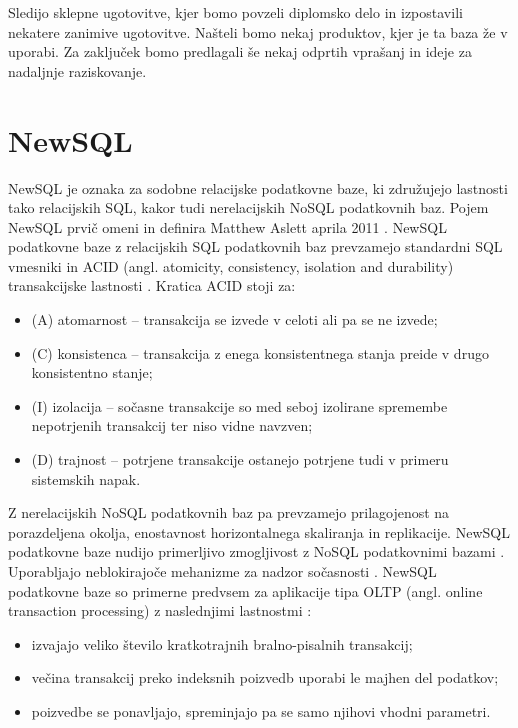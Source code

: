 \documentclass[a4paper, 12pt]{book}
\begin{document}
Sledijo sklepne ugotovitve, kjer bomo povzeli diplomsko delo in izpostavili nekatere zanimive ugotovitve. Našteli bomo nekaj produktov, kjer je ta baza že v uporabi. Za zaključek bomo predlagali še nekaj odprtih vprašanj in ideje za nadaljnje raziskovanje.


\chapter{NewSQL}
NewSQL je oznaka za sodobne relacijske podatkovne baze, ki združujejo lastnosti tako relacijskih SQL, kakor tudi nerelacijskih NoSQL podatkovnih baz. Pojem NewSQL prvič omeni in definira Matthew Aslett aprila 2011 \cite{Pavlo2016Sep}. NewSQL podatkovne baze z relacijskih SQL podatkovnih baz prevzamejo standardni SQL vmesniki in ACID (angl. atomicity, consistency, isolation and durability) transakcijske lastnosti \cite{oliveira2017newsql}. Kratica ACID stoji za:

\begin{itemize}
    \item (A) atomarnost – transakcija se izvede v celoti ali pa se ne izvede;
    \item (C) konsistenca – transakcija z enega konsistentnega stanja preide v drugo konsistentno stanje;
    \item (I) izolacija – sočasne transakcije so med seboj izolirane spremembe nepotrjenih transakcij ter niso vidne navzven;
    \item (D) trajnost – potrjene transakcije ostanejo potrjene tudi v primeru sistemskih napak.
\end{itemize}

\noindent Z nerelacijskih NoSQL podatkovnih baz pa prevzamejo prilagojenost na porazdeljena okolja, enostavnost horizontalnega skaliranja in replikacije. NewSQL podatkovne baze nudijo primerljivo zmogljivost z NoSQL podatkovnimi bazami \cite{oliveira2017newsql}. Uporabljajo neblokirajoče mehanizme za nadzor sočasnosti \cite{NewSQLNewWayToHandleBigData}. NewSQL podatkovne baze so primerne predvsem za aplikacije tipa OLTP (angl. online transaction processing) z naslednjimi lastnostmi \cite{Pavlo2016Sep}:
\begin{itemize}
    \item izvajajo veliko število kratkotrajnih bralno-pisalnih transakcij;
    \item večina transakcij preko indeksnih poizvedb uporabi le majhen del podatkov;
    \item poizvedbe se ponavljajo, spreminjajo pa se samo njihovi vhodni parametri.
\end{itemize}
\end{document}
